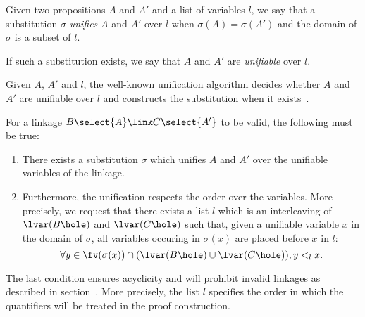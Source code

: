 \begin{definition}[Unification] Given two propositions $A$ and $A'$ and a list of variables
  $l$, we say that a substitution $\sigma$ \emph{unifies} $A$ and $A'$ over $l$
  when $\sigma(A)=\sigma(A')$ and the domain of $\sigma$ is a subset of $l$. 

  If such a substitution exists, we say that $A$ and $A'$ are \emph{unifiable}
  over $l$.
\end{definition}
Given $A$, $A'$ and $l$, the well-known unification algorithm decides
whether $A$ and $A'$ are unifiable over $l$ and constructs the
substitution when it exists~\cite{Montanari}.

\begin{condition}[Identity]\label{cond:unif} 
  For a linkage $B\select{A}\link C\select{A'}$ to be valid, the following must
  be true:
  \begin{enumerate}
   \item There exists a substitution $\sigma$ which unifies $A$ and
     $A'$ over the unifiable variables of the linkage.
   \item \label{lab:cond} Furthermore, the unification respects the order over
     the variables. More precisely, we request that there exists a list $l$
     which is an interleaving of $\lvar(B\hole)$ and $\lvar(C\hole)$ such
     that, given a unifiable variable $x$ in the domain of $\sigma$, all
     variables occuring in $\sigma(x)$ are placed before $x$ in $l$:
     $$\forall
     y\in\fv(\sigma(x))\cap(\lvar(B\hole)\cup\lvar(C\hole)), y <_l x.$$
     \end{enumerate}
\end{condition}

The last condition ensures acyclicity and will prohibit invalid
linkages as described in section~. More precisely,
the list $l$ specifies the order in which the quantifiers will be
treated in the proof construction.



